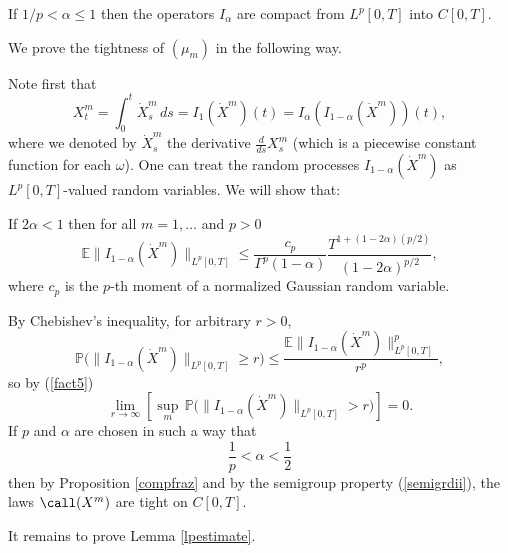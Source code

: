 \documentclass[preprint]{imsart}
\def\P{\mathbb P}
\def\E{\mathbb E}
\begin{document}
{\begin{Proposition}\label{compfraz}
If $1/p<\alpha \leq 1$ then the operators $I_\alpha$
are compact from $L^p[0,T]$ into $C[0,T]$.
\end{Proposition}

We prove the tightness of $(\mu_m)$ in the following
way.

Note first that
\begin{equation}\label{fact4}
X^m_t =\int_0^t \dot{X}^m_s \, ds = I_1(\dot{X}^m)(t)
= I_\alpha (I_{1-\alpha } (\dot{X}^m))(t),
\end{equation}
where we denoted by $\dot{X}^m_s $ the derivative
$\frac{d}{ds}X^m_s $ (which is a piecewise constant
function for each $\omega$). One can treat the random
processes $I_{1-\alpha } (\dot{X}^m)$ as
$L^p[0,T]$-valued random variables. We will show that:

\begin{Lemma}\label{lpestimate}
If $2\alpha <1$  then for all $m=1,\ldots$ and
$p>0$
\begin{equation}\label{fact5}
\E \| I_{1-\alpha } (\dot{X}^m)\|_{L^p[0,T]}\leq
\frac{c_p}{\Gamma^p(1-\alpha)}
\frac{T^{1+(1-2\alpha){(p/2)}}}
{ (1-2\alpha)^{p/2}},
\end{equation}
 where $c_p$ is the $p$-th
moment of a normalized Gaussian random variable.
\end{Lemma}


By Chebishev's inequality, for arbitrary $r>0$,
$$
\P\bigg(  \| I_{1-\alpha } (\dot{X}^m)\|_{L^p[0,T]}
\geq r\bigg)\leq
\frac{\E  \| I_{1-\alpha } (\dot{X}^m)\|_{L^p[0,T]}^p}{r^p},
$$
so by (\ref{fact5})
$$
\lim_{r\to\infty} \left[
\sup_m \, \P\bigg(  \| I_{1-\alpha } (\dot{X}^m)\|_{L^p[0,T]}
> r\bigg)\right] =0.
$$
If $p$ and $\alpha$ are chosen in such a way that
$$
\frac{1}{p}<\alpha<\frac{1}{2}
$$
then by Proposition \ref{compfraz} and by the semigroup
property (\ref{semigrdii}), the laws $\call(X^m)$ are
tight on $C[0,T]$.


It remains to prove Lemma \ref{lpestimate}.

}
\end{document}
